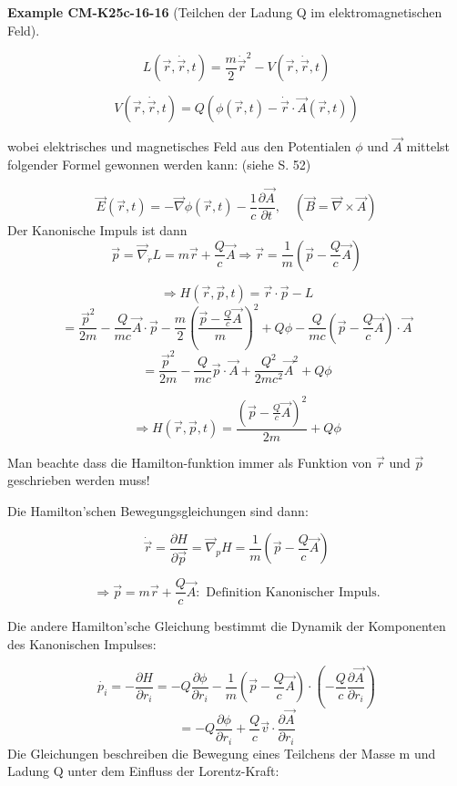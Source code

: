 \documentclass[10pt, letterpaper]{article}
\newcommand{\CustomHeading}[3]{%
  \par\medskip\noindent%
  \textbf{#1 #2} \textnormal{(#3)}.\enskip%
}
\newenvironment{EXA}[2]{\begin{unitbox}\CustomHeading{Example}{#1}{#2}}{\end{unitbox}}
\begin{document}
\begin{EXA}{CM-K25c-16-16}{Teilchen der Ladung Q im elektromagnetischen Feld}
\[L(\vec{r}, \dot{\vec{r}}, t) = \frac{m}{2}\dot{\vec{r}}^2 - V(\vec{r}, \dot{\vec{r}}, t)\]

\[V(\vec{r}, \dot{\vec{r}}, t) = Q(\phi(\vec{r},t) - \dot{\vec{r}}\cdot\vec{A}(\vec{r},t))\]

wobei elektrisches und magnetisches Feld aus den Potentialen $\phi$ und $\vec{A}$ mittelst folgender Formel gewonnen werden kann: (siehe S. 52)

\[\vec{E}(\vec{r},t) = -\vec{\nabla}\phi(\vec{r},t) - \frac{1}{c}\frac{\partial\vec{A}}{\partial t}, \quad (\vec{B} = \vec{\nabla}\times\vec{A})\]
Der Kanonische Impuls ist dann
\[\vec{p} = \vec{\nabla}_{\dot{r}} L = m\vec{r} + \frac{Q}{c}\vec{A} \Rightarrow \vec{r} = \frac{1}{m}\left(\vec{p} - \frac{Q}{c}\vec{A}\right)\]

\[\Rightarrow H(\vec{r},\vec{p},t) = \vec{r}\cdot\vec{p} - L\]
\[= \frac{\vec{p}^2}{2m} - \frac{Q}{mc}\vec{A}\cdot\vec{p} - \frac{m}{2}\left(\frac{\vec{p}-\frac{Q}{c}\vec{A}}{m}\right)^2 + Q\phi - \frac{Q}{mc}\left(\vec{p}-\frac{Q}{c}\vec{A}\right)\cdot\vec{A}\]
\[= \frac{\vec{p}^2}{2m} - \frac{Q}{mc}\vec{p}\cdot\vec{A} + \frac{Q^2}{2mc^2}\vec{A}^2 + Q\phi\]

\[\Rightarrow \boxed{H(\vec{r},\vec{p},t) = \frac{\left(\vec{p}-\frac{Q}{c}\vec{A}\right)^2}{2m} + Q\phi}\]

Man beachte dass die Hamilton-funktion immer als Funktion von $\vec{r}$ und $\vec{p}$ geschrieben werden muss!

Die Hamilton'schen Bewegungsgleichungen sind dann:

\[\dot{\vec{r}} = \frac{\partial H}{\partial \vec{p}} = \vec{\nabla}_p H = \frac{1}{m}\left(\vec{p} - \frac{Q}{c}\vec{A}\right)\]

\[\Rightarrow \vec{p} = m\vec{r} + \frac{Q}{c}\vec{A}: \text{ Definition Kanonischer Impuls.}\]

Die andere Hamilton'sche Gleichung bestimmt die Dynamik der Komponenten des Kanonischen Impulses:

\[\dot{p_i} = -\frac{\partial H}{\partial r_i} = -Q\frac{\partial \phi}{\partial r_i} - \frac{1}{m}\left(\vec{p}-\frac{Q}{c}\vec{A}\right)\cdot\left(-\frac{Q}{c}\frac{\partial \vec{A}}{\partial r_i}\right)\]
\[= -Q\frac{\partial \phi}{\partial r_i} + \frac{Q}{c}\vec{v}\cdot\frac{\partial \vec{A}}{\partial r_i}\]
Die Gleichungen beschreiben die Bewegung eines Teilchens der Masse m und Ladung Q unter dem Einfluss der Lorentz-Kraft:


\end{EXA}
\end{document}
